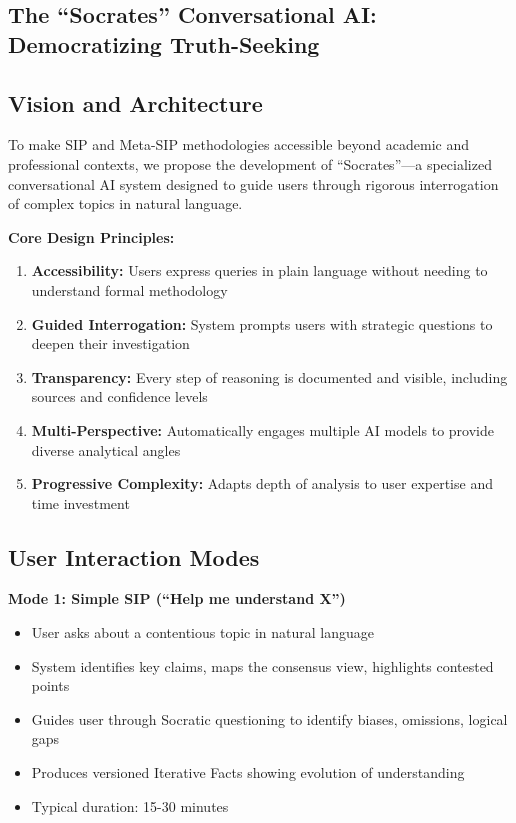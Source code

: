 \documentclass[11pt,a4paper]{article}
\begin{document}
\begin{small}
\section{The ``Socrates'' Conversational AI: Democratizing Truth-Seeking}

\subsection{Vision and Architecture}

To make SIP and Meta-SIP methodologies accessible beyond academic and professional contexts, we propose the development of ``Socrates''---a specialized conversational AI system designed to guide users through rigorous interrogation of complex topics in natural language.

\textbf{Core Design Principles:}
\begin{enumerate}[leftmargin=*]
    \item \textbf{Accessibility:} Users express queries in plain language without needing to understand formal methodology
    \item \textbf{Guided Interrogation:} System prompts users with strategic questions to deepen their investigation
    \item \textbf{Transparency:} Every step of reasoning is documented and visible, including sources and confidence levels
    \item \textbf{Multi-Perspective:} Automatically engages multiple AI models to provide diverse analytical angles
    \item \textbf{Progressive Complexity:} Adapts depth of analysis to user expertise and time investment
\end{enumerate}

\subsection{User Interaction Modes}

\textbf{Mode 1: Simple SIP (``Help me understand X'')}
\begin{itemize}[nosep]
    \item User asks about a contentious topic in natural language
    \item System identifies key claims, maps the consensus view, highlights contested points
    \item Guides user through Socratic questioning to identify biases, omissions, logical gaps
    \item Produces versioned Iterative Facts showing evolution of understanding
    \item Typical duration: 15-30 minutes
\end{itemize}


\end{small}
\end{document}
